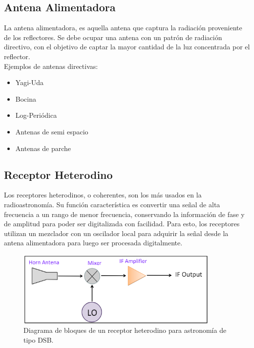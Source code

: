 \subsection{Antena Alimentadora}

La antena alimentadora, es aquella antena que captura la radiación proveniente de los reflectores. Se debe ocupar una antena con un patrón de radiación directivo, con el objetivo de captar la mayor cantidad de la luz concentrada por el reflector.\\

Ejemplos de antenas directivas:

\begin{itemize}
    \item Yagi-Uda
    \item Bocina
    \item Log-Periódica
    \item Antenas de semi espacio
    \item Antenas de parche
\end{itemize}

\subsection{Receptor Heterodino}

Los receptores heterodinos, o coherentes, son los más usados en la radioastronomía. Su función característica es convertir una señal de alta frecuencia a un rango de menor frecuencia, conservando la información de fase y de amplitud para poder ser digitalizada con facilidad\cite{Finger2013}. Para esto, los receptores utilizan un mezclador con un oscilador local para adquirir la señal desde la antena alimentadora para luego ser procesada digitalmente.\\

\begin{figure}
    \centering
    \includegraphics[width = 10cm]{img/heterodine.png}
    \caption{Diagrama de bloques de un receptor heterodino para astronomía de tipo DSB.}
    \label{fig:radio}
\end{figure}

